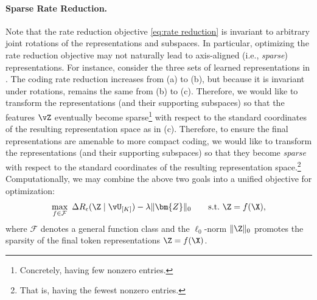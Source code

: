 \documentclass[../../book-main.tex]{subfiles}
\begin{document}
\paragraph{Sparse Rate Reduction.} Note that the rate reduction objective \eqref{eq:rate reduction} is invariant to arbitrary joint rotations of the representations and subspaces. In particular, optimizing the rate reduction objective may not naturally lead to axis-aligned (i.e., \textit{sparse}) representations. {For instance, consider the three sets of learned representations in . The coding rate reduction increases from (a) to (b), but because it is invariant under rotations, remains the same from (b) to (c).} Therefore, we would like to transform the representations (and their supporting subspaces) so that the features $\vZ$ eventually become sparse\footnote{Concretely, having few nonzero entries.} with respect to the standard coordinates of the resulting representation space {as in (c)}. Therefore, to ensure the final representations are amenable to more compact coding, we would like to transform the representations (and their supporting subspaces) so that they become \textit{sparse} with respect to the standard coordinates of the resulting representation space.\footnote{That is, having the fewest nonzero entries.} Computationally, we may combine the above two goals into a unified objective for optimization:
\vspace{0.05in}
\begin{equation}
   \max_{f \in \mathcal{F}}\ \Delta R_{\epsilon}(\Z \mid \vU_{[K]}) - \lambda \|\bm{Z}\|_0 \qquad \text{s.t.}\ \Z = f(\X),
   \label{eq:sparse-rr}
\end{equation}
where $\mathcal{F}$ denotes a general function class and the $\ell_0$-norm $\|\Z\|_0$ promotes the sparsity of the final token representations \(\Z = f(\X)\).%
\end{document}
